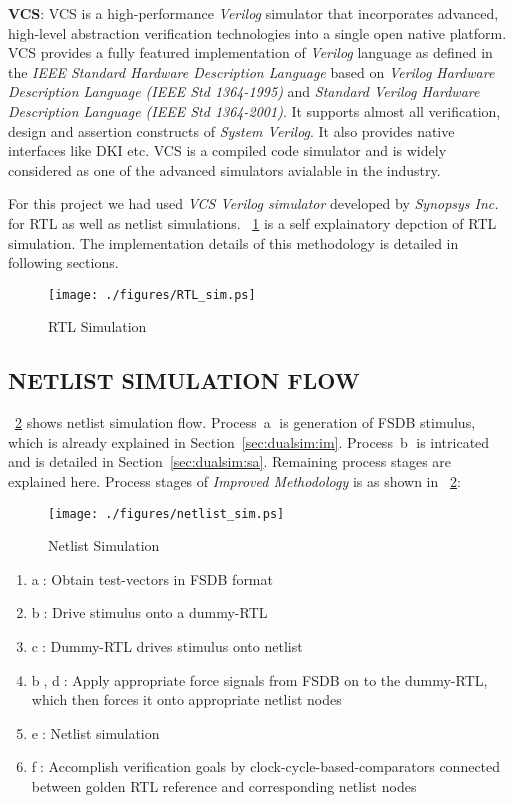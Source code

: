 {\bf VCS}: VCS is a high-performance {\it Verilog} simulator that  incorporates advanced, high-level abstraction verification  technologies into a single open native platform. VCS provides a fully featured implementation of {\it Verilog} language as defined in the {\it IEEE Standard Hardware Description Language} based on {\it Verilog Hardware Description Language (IEEE Std 1364-1995)} and {\it Standard Verilog Hardware Description Language (IEEE Std 1364-2001)}. It supports almost all verification, design and assertion constructs of {\it System Verilog}. It also provides native interfaces like DKI etc. VCS is a compiled code simulator and is widely considered as one of the advanced simulators avialable in the industry.

For this project we had used {\it VCS Verilog simulator} developed by {\it Synopsys Inc.} for RTL as well as netlist simulations. \figurename{~\ref{fig:RTL_sim.eps}} is a self explainatory depction of RTL simulation. The implementation details of this methodology is detailed in following sections. 

\begin{figure}[h]
\centering
\texttt{[image: ./figures/RTL\_sim.ps]}
\caption{RTL Simulation}
\label{fig:RTL_sim.eps}
\end{figure}


\subsection{NETLIST SIMULATION FLOW}
\figurename~{\ref{fig:netlist_sim.ps}} shows netlist simulation flow. Process~\textcircled{a} is generation of FSDB stimulus, which is already explained in Section~\ref{sec:dualsim:im}. Process~\textcircled{b} is intricated and is detailed in Section~\ref{sec:dualsim:sa}. Remaining process stages are explained here.
Process stages of {\it Improved Methodology} is as shown in \figurename~{\ref{fig:netlist_sim.ps}}:

\begin{figure}[h]
\centering
\texttt{[image: ./figures/netlist\_sim.ps]}
\caption{Netlist Simulation}
\label{fig:netlist_sim.ps}
\end{figure}

\begin{enumerate}
	\item \textcircled{a}: Obtain test-vectors in FSDB format
	\item \textcircled{b}: Drive stimulus onto a dummy-RTL
	\item \textcircled{c}: Dummy-RTL drives stimulus onto netlist
	\item \textcircled{b}, \textcircled{d}: Apply appropriate force signals from FSDB on to the dummy-RTL, which then forces it onto appropriate netlist nodes
	\item \textcircled{e}: Netlist simulation
	\item \textcircled{f}: Accomplish verification goals by clock-cycle-based-comparators connected between golden RTL reference and corresponding netlist nodes
\end{enumerate}

